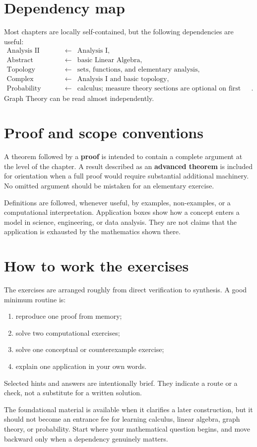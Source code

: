 \section*{Dependency map}

Most chapters are locally self-contained, but the following dependencies are useful:
\[
\begin{array}{ccl}
\text{Analysis II} &\longleftarrow& \text{Analysis I},\\
\text{Abstract Algebra} &\longleftarrow& \text{basic Linear Algebra},\\
\text{Topology} &\longleftarrow& \text{sets, functions, and elementary analysis},\\
\text{Complex Analysis} &\longleftarrow& \text{Analysis I and basic topology},\\
\text{Probability} &\longleftarrow& \text{calculus; measure theory sections are optional on first reading}.
\end{array}
\]
Graph Theory can be read almost independently.

\section*{Proof and scope conventions}

A theorem followed by a \textbf{proof} is intended to contain a complete argument at the level of the chapter. A result described as an \textbf{advanced theorem} is included for orientation when a full proof would require substantial additional machinery. No omitted argument should be mistaken for an elementary exercise.

Definitions are followed, whenever useful, by examples, non-examples, or a computational interpretation. Application boxes show how a concept enters a model in science, engineering, or data analysis. They are not claims that the application is exhausted by the mathematics shown there.

\section*{How to work the exercises}

The exercises are arranged roughly from direct verification to synthesis. A good minimum routine is:
\begin{enumerate}
    \item reproduce one proof from memory;
    \item solve two computational exercises;
    \item solve one conceptual or counterexample exercise;
    \item explain one application in your own words.
\end{enumerate}
Selected hints and answers are intentionally brief. They indicate a route or a check, not a substitute for a written solution.

\begin{mynote}
The foundational material is available when it clarifies a later construction, but it should not become an entrance fee for learning calculus, linear algebra, graph theory, or probability. Start where your mathematical question begins, and move backward only when a dependency genuinely matters.
\end{mynote}
